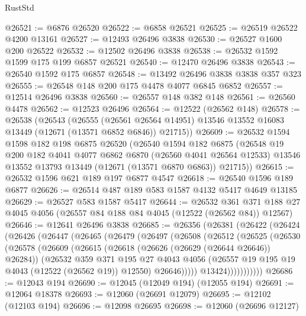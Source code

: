 \begin{lexlean}{RustStd}
\begin{coremodule}
@26521 := @6876 @26520
@26522 := @6858 @26521
@26525 := @26519 @26522 @4200 @13161
@26527 := @12493 @26496 @3838
@26530 := @26527 @1600 @200 @26522
@26532 := @12502 @26496 @3838
@26538 := @26532 @1592 @1599 @175 @199 @6857 @26521
@26540 := @12470 @26496 @3838
@26543 := @26540 @1592 @175 @6857
@26548 := @13492 @26496 @3838 @3838 @357 @323
@26555 := @26548 @148 @200 @175 @4478 @4077 @6845 @6852
@26557 := @12514 @26496 @3838
@26560 := @26557 @148 @382 @148
@26561 := @26560 @4478
@26562 := @12523 @26496
@26564 := @12522 (@26562 @148)
@26578 := @26538
    (@26543
      (@26555
        (@26561 @26564 @14951)
        @13546
        @13552
        @16083
        @13449
        (@12671 (@13571 @6852 @6846))
        @21715))
@26609 := @26532
    @1594
    @1598
    @182
    @198
    @6875
    @26520
    (@26540
      @1594
      @182
      @6875
      (@26548
        @19
        @200
        @182
        @4041
        @4077
        @6862
        @6870
        (@26560 @4041 @26564 @12533)
        @13546
        @13552
        @13793
        @13449
        (@12671 (@13571 @6870 @6863))
        @21715))
@26615 := @26532 @1596 @621 @189 @197 @6877 @4547
@26618 := @26540 @1596 @189 @6877
@26626 := @26514 @487 @189 @583 @1587 @4132 @5417 @4649 @13185
@26629 := @26527 @583 @1587 @5417
@26644 := @26532
    @361
    @371
    @188
    @27
    @4045
    @4056
    (@26557 @84 @188 @84 @4045 (@12522 (@26562 @84)) @12567)
@26646 := @12641 @26496 @3838
@26685 := @26356
    (@26381
      (@26422
        (@26424
          (@26426
            (@26447
              (@26465
                (@26479
                  (@26497
                    (@26508
                      (@26512
                        (@26525
                          (@26530
                            (@26578
                              (@26609
                                (@26615
                                  (@26618 (@26626 (@26629 (@26644 @26646)) @26284))
                                  (@26532
                                    @359
                                    @371
                                    @195
                                    @27
                                    @4043
                                    @4056
                                    (@26557 @19 @195 @19 @4043 (@12522 (@26562 @19)) @12550)
                                    @26646)))))
                          @13424)))))))))))
@26686 := @12043 @194
@26690 := @12045 (@12049 @194) (@12055 @194)
@26691 := @12064 @18378
@26693 := @12060 (@26691 @12079)
@26695 := @12102 (@12103 @194)
@26696 := @12098 @26695
@26698 := @12060 (@26696 @12127)

\end{coremodule}
\end{lexlean}
